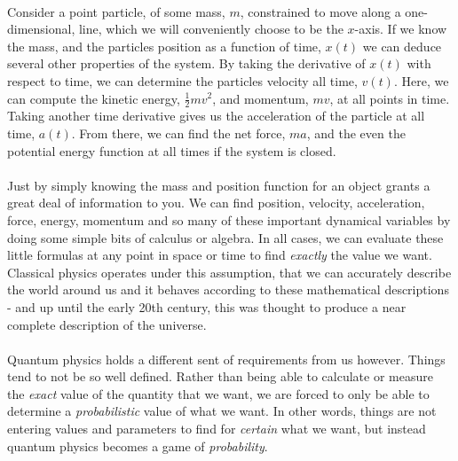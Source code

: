 \documentclass[12pt,letterpaper]{book}
\begin{document}

\paragraph*{}Consider a point particle, of some mass, $m$, constrained to move along a one-dimensional, line, which we will conveniently choose to be the $x$-axis. If we know the mass, and the particles position as a function of time, $x(t)$ we can deduce several other properties of the system. By taking the derivative of $x(t)$ with respect to time, we can determine the particles velocity all time, $v(t)$. Here, we can compute the kinetic energy, $\frac{1}{2}mv^2$, and momentum, $mv$, at all points in time. Taking another time derivative gives us the acceleration of the particle at all time, $a(t)$. From there, we can find the net force, $ma$, and the even the potential energy function at all times if the system is closed.
\paragraph*{}Just by simply knowing the mass and position function for an object grants a great deal of information to you. We can find position, velocity, acceleration, force, energy, momentum and so many of these important dynamical variables by doing some simple bits of calculus or algebra. In all cases, we can evaluate these little formulas at any point in space or time to find \textit{exactly} the value we want. Classical physics operates under this assumption, that we can accurately describe the world around us and it behaves according to these mathematical descriptions - and up until the early 20th century, this was thought to produce a near complete description of the universe.
\paragraph*{}Quantum physics holds a different sent of requirements from us however. Things tend to not be so well defined. Rather than being able to calculate or measure the \textit{exact} value of the quantity that we want, we are forced to only be able to determine a \textit{probabilistic} value of what we want. In other words, things are not entering values and parameters to find for \textit{certain} what we want, but instead quantum physics becomes a game of \textit{probability}.
\end{document}
